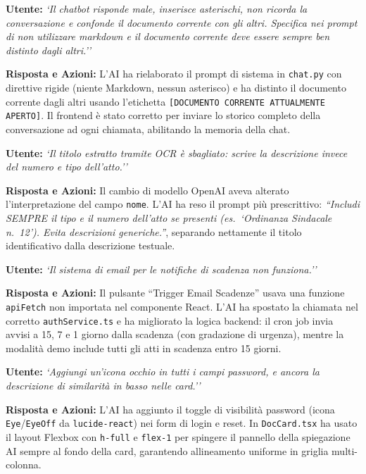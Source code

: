 \documentclass[12pt,a4paper,oneside]{report}
\begin{document}
\begin{promptbox}[title={Prompt 19 --- Chatbot con Memoria, Contesto e Senza Markdown}]
\textbf{Utente:} \textit{`Il chatbot risponde male, inserisce asterischi, non ricorda la conversazione e confonde il documento corrente con gli altri. Specifica nei prompt di non utilizzare markdown e il documento corrente deve essere sempre ben distinto dagli altri.''}

\textbf{Risposta e Azioni:} L'AI ha rielaborato il prompt di sistema in \texttt{chat.py} con direttive rigide (niente Markdown, nessun asterisco) e ha distinto il documento corrente dagli altri usando l'etichetta \texttt{[DOCUMENTO CORRENTE ATTUALMENTE APERTO]}. Il frontend \`{e} stato corretto per inviare lo storico completo della conversazione ad ogni chiamata, abilitando la memoria della chat.
\end{promptbox}

\begin{promptbox}[title={Prompt 20 --- Correzione Estrazione Titolo OCR tramite LLM}]
\textbf{Utente:} \textit{`Il titolo estratto tramite OCR \`{e} sbagliato: scrive la descrizione invece del numero e tipo dell'atto.''}

\textbf{Risposta e Azioni:} Il cambio di modello OpenAI aveva alterato l'interpretazione del campo \texttt{nome}. L'AI ha reso il prompt pi\`{u} prescrittivo: \textit{``Includi SEMPRE il tipo e il numero dell'atto se presenti (es.\ `Ordinanza Sindacale n.~12'). Evita descrizioni generiche.''}, separando nettamente il titolo identificativo dalla descrizione testuale.
\end{promptbox}

\begin{promptbox}[title={Prompt 21 --- Risoluzione Bug Email Notifiche di Scadenza}]
\textbf{Utente:} \textit{`Il sistema di email per le notifiche di scadenza non funziona.''}

\textbf{Risposta e Azioni:} Il pulsante ``Trigger Email Scadenze'' usava una funzione \texttt{apiFetch} non importata nel componente React. L'AI ha spostato la chiamata nel corretto \texttt{authService.ts} e ha migliorato la logica backend: il cron job invia avvisi a 15, 7 e 1 giorno dalla scadenza (con gradazione di urgenza), mentre la modalit\`{a} demo include tutti gli atti in scadenza entro 15 giorni.
\end{promptbox}

\begin{promptbox}[title={Prompt 22 --- Visibilit\`{a} Password e Ancoraggio Spiegazione AI}]
\textbf{Utente:} \textit{`Aggiungi un'icona occhio in tutti i campi password, e ancora la descrizione di similarit\`{a} in basso nelle card.''}

\textbf{Risposta e Azioni:} L'AI ha aggiunto il toggle di visibilit\`{a} password (icona \texttt{Eye}/\texttt{EyeOff} da \texttt{lucide-react}) nei form di login e reset. In \texttt{DocCard.tsx} ha usato il layout Flexbox con \texttt{h-full} e \texttt{flex-1} per spingere il pannello della spiegazione AI sempre al fondo della card, garantendo allineamento uniforme in griglia multi-colonna.
\end{promptbox}
\end{document}
